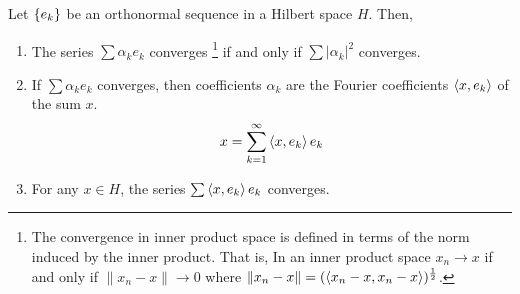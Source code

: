 \begin{theorem}[convergence]
Let $\left\{e_k\right\}$ be an orthonormal sequence in a Hilbert space $H$.
Then,
\begin{enumerate}
	\item The series $\sum \alpha_k e_k$ converges
	\dag\footnote{
		The convergence in inner product space is defined in terms of the norm induced by the inner product.
		That is, In an inner product space $x_n \to x$ if and only if $\| x_n -x \| \to 0$ where $\|x_n -x \| = (\left\langle x_n-x,x_n-x \right\rangle)^\frac{1}{2}$.}
	if and only if $\sum |\alpha_k|^2$ converges.
\item If $\sum \alpha_k e_k$ converges, then coefficients $\alpha_k$ are the Fourier coefficients $\left\langle x,e_k \right\rangle$ of the sum $x$.
	\[ x = \sum_{k=1}^\infty \left\langle x,e_k \right\rangle e_k \]
\item For any $x \in H$, the series $\sum \left\langle x,e_k \right\rangle e_k$ converges.
\end{enumerate}
\end{theorem}
